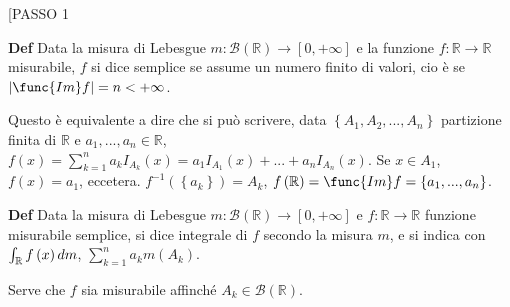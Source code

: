 \documentclass{article}
\begin{document}
[PASSO 1

\textbf{Def }Data la misura di Lebesgue $m:\mathcal{B}\left( 
\mathbb{R}
\right) \rightarrow \left[ 0,+\infty \right] $ e la funzione $f:%
\mathbb{R}
\rightarrow 
\mathbb{R}
$ misurabile, $f$ si dice semplice se assume un numero finito di valori, cio%
\`{e} se $\left\vert \func{Im}f\right\vert =n<+\infty $.

Questo \`{e} equivalente a dire che si pu\`{o} scrivere, data $\left\{
A_{1},A_{2},...,A_{n}\right\} $ partizione finita di $%
\mathbb{R}
$ e $a_{1},...,a_{n}\in 
\mathbb{R}
$, $f\left( x\right) =\sum_{k=1}^{n}a_{k}I_{A_{k}}\left( x\right)
=a_{1}I_{A_{1}}\left( x\right) +...+a_{n}I_{A_{n}}\left( x\right) $. Se $%
x\in A_{1}$, $f\left( x\right) =a_{1}$, eccetera. $f^{-1}\left( \left\{
a_{k}\right\} \right) =A_{k}$, $f\left( 
\mathbb{R}
\right) =\func{Im}f=\left\{ a_{1},...,a_{n}\right\} $.

\textbf{Def }Data la misura di Lebesgue $m:\mathcal{B}\left( 
\mathbb{R}
\right) \rightarrow \left[ 0,+\infty \right] $ e $f:%
\mathbb{R}
\rightarrow 
\mathbb{R}
$ funzione misurabile semplice, si dice integrale di $f$ secondo la misura $%
m $, e si indica con $\int_{%
\mathbb{R}
}f\left( x\right) dm$, $\sum_{k=1}^{n}a_{k}m\left( A_{k}\right) $.

Serve che $f$ sia misurabile affinch\'{e} $A_{k}\in \mathcal{B}\left( 
\mathbb{R}
\right) $.
\end{document}
